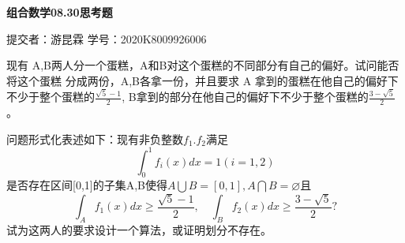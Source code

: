 \documentclass[fontset=windows,11pt]{article}
\newtheorem{question}{\hskip 1.7em}
\begin{document}
        \begin{center}
            {\Large \bf 组合数学08.30思考题}\\
        \end{center}
        \begin{kaishu}
            \hfill 提交者：游昆霖 \quad 学号：2020K8009926006
        \end{kaishu}
        \begin{question}
        现有 A,B两人分一个蛋糕，A和B对这个蛋糕的不同部分有自己的偏好。试问能否将这个蛋糕
        分成两份，A,B各拿一份，并且要求 A 拿到的蛋糕在他自己的偏好下不少于整个蛋糕的$\frac{\sqrt{5}-1}{2}$,
        B拿到的部分在他自己的偏好下不少于整个蛋糕的$\frac{3-\sqrt{5}}{2}$。


            问题形式化表述如下：现有非负整数$f_1.f_2$满足
            \[\int_0^1f_i(x)dx=1(i=1,2)\]
        是否存在区间[0,1]的子集A,B使得$A\bigcup B=[0,1],A\bigcap B=\varnothing$且\\
            \[ \int_Af_1(x)dx \geq \frac{\sqrt{5}-1}{2}, \quad \int_Bf_2(x)dx \geq \frac{3-\sqrt{5}}{2} ?\]
        试为这两人的要求设计一个算法，或证明划分不存在。
        \end{question}
\end{document}
